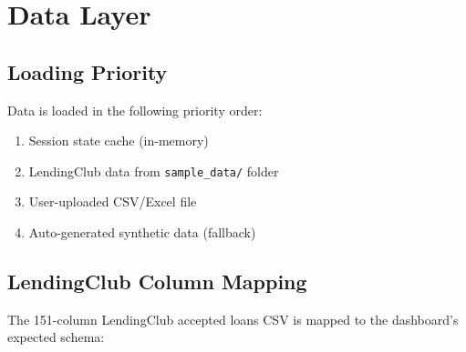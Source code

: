 \documentclass[12pt,a4paper]{article}
\begin{document}
\section{Data Layer}

\subsection{Loading Priority}
Data is loaded in the following priority order:

\begin{enumerate}
    \item Session state cache (in-memory)
    \item LendingClub data from \texttt{sample\_data/} folder
    \item User-uploaded CSV/Excel file
    \item Auto-generated synthetic data (fallback)
\end{enumerate}

\subsection{LendingClub Column Mapping}

The 151-column LendingClub accepted loans CSV is mapped to the dashboard's expected schema:
\end{document}
